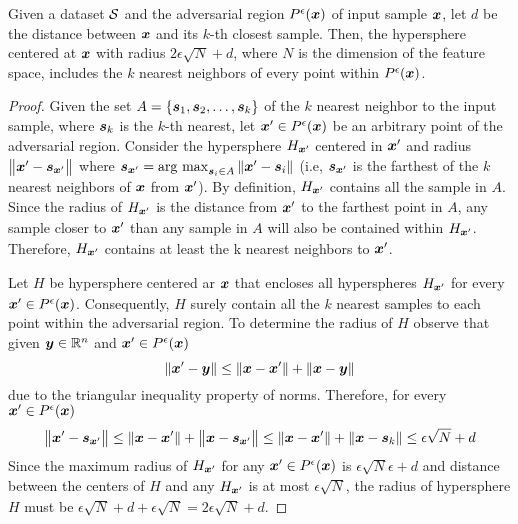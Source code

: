 \begin{proposition}
\label{prop:sound-sample-selection}
Given a dataset $\set$ and the adversarial region $\pert$ of input sample $\vinput$, let $d$ be the distance between $\vinput$ and its $k$-th closest sample. Then, the hypersphere centered at $\vinput$ with radius $\displaystyle 2\epsilon\sqrt{N} + d$, where $N$ is the dimension of the feature space, includes the $k$ nearest neighbors of every point within $\pert$.
\end{proposition}
\begin{proof}
Given the set $A = \{\sample[1], \sample[2],\ldots,\sample[k]\}$ of the $k$ nearest neighbor to the input sample, where $\sample[k]$ is the $k$-th nearest, let $\x[]' \in \pert$ be an arbitrary point of the adversarial region. Consider the hypersphere $H_{\x[]'}$ centered in $\x[]'$ and radius $\norm{\x[]' - \sample[{\x[]'}]}$ where $\sample[{\x[]'}] = \argmax_{\sample \in A} \norm{\x[]' - \sample}$ (i.e, $\sample[{\x[]'}]$ is the farthest of the $k$ nearest neighbors of $\vinput$ from $\x[]'$). By definition, $H_{\x[]'}$ contains all the sample in $A$. Since the radius of $H_{\x[]'}$ is the distance from $\x[]'$ to the farthest point in $A$, any sample closer to $\x[]'$ than any sample in $A$ will also be contained within $H_{\x[]'}$. Therefore, $H_{\x[]'}$ contains at least the k nearest neighbors to $\x[]'$.

\noindent Let $H$ be hypersphere centered ar $\vinput$ that encloses all hyperspheres $H_{\x[]'}$ for every $\x[]' \in \pert$. Consequently, $H$ surely contain all the $k$ nearest samples to each point within the adversarial region. To determine the radius of $H$ observe that given $\vec{y} \in \R$ and $\x[]' \in \pert$
\[
  \norm{\x[]' - \vec{y}} \le \norm{\vinput - \x[]'} + \norm{\vinput - \vec{y}}
\]
due to the triangular inequality property of norms. Therefore, for every $\x[]' \in \pert$
\[
\norm{\x[]' - \sample[{\x[]'}]} \le \norm{\vinput - \x[]'} + \norm{\vinput - \sample[{\x[]'}]} \le \norm{\vinput - \x[]'} + \norm{\vinput - \sample[k]} \le \epsilon\sqrt{N}  + d
\]
Since the maximum radius of $H_{\x[]'}$ for any $\x[]' \in \pert$ is $\epsilon\sqrt{N} \epsilon + d$ and distance between the centers of $H$ and any $H_{\x[]'}$ is at most $\epsilon\sqrt{N}$, the radius of hypersphere $H$ must be $\displaystyle \epsilon\sqrt{N} + d + \epsilon\sqrt{N} = 2\epsilon\sqrt{N} + d$.
\end{proof}

